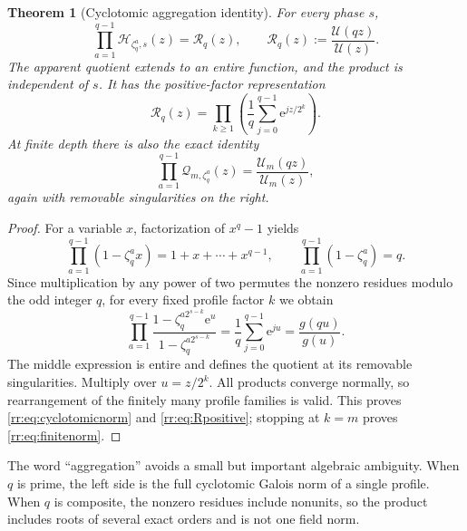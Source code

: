 \documentclass[11pt,a4paper,oneside,openany]{book}
\numberwithin{equation}{chapter}
\newtheorem{theorem}{Theorem}[chapter]
\theoremstyle{definition}
\theoremstyle{remark}
\newcommand{\e}{\mathrm e}
\newcommand{\Up}{\mathcal U}
\newcommand{\Rp}{\mathcal R}
\newcommand{\Hp}{\mathcal H}
\newcommand{\Qp}{\mathcal Q}
\begin{document}
\begin{theorem}[Cyclotomic aggregation identity]
\label{rr:thm:norm}
For every phase \(s\),
\begin{equation}
 \prod_{a=1}^{q-1}\Hp_{\zeta_q^a,s}(z)
 =\Rp_q(z),\qquad
 \Rp_q(z):=\frac{\Up(qz)}{\Up(z)}.
 \label{rr:eq:cyclotomicnorm}
\end{equation}
The apparent quotient extends to an entire function, and the product is independent of \(s\). It has the positive-factor representation
\begin{equation}
 \Rp_q(z)=\prod_{k\geq1}
       \left(\frac1q\sum_{j=0}^{q-1}\e^{jz/2^k}\right).
 \label{rr:eq:Rpositive}
\end{equation}
At finite depth there is also the exact identity
\begin{equation}
 \prod_{a=1}^{q-1}\Qp_{m,\zeta_q^a}(z)
 =\frac{\Up_m(qz)}{\Up_m(z)},
 \label{rr:eq:finitenorm}
\end{equation}
again with removable singularities on the right.
\end{theorem}
\begin{proof}
For a variable \(x\), factorization of \(x^q-1\) yields
\[
 \prod_{a=1}^{q-1}(1-\zeta_q^a x)=1+x+\cdots+x^{q-1},
 \qquad \prod_{a=1}^{q-1}(1-\zeta_q^a)=q.
\]
Since multiplication by any power of two permutes the nonzero residues modulo the odd integer \(q\), for every fixed profile factor \(k\) we obtain
\[
 \prod_{a=1}^{q-1}
 \frac{1-\zeta_q^{a2^{s-k}}\e^u}{1-\zeta_q^{a2^{s-k}}}
 =\frac1q\sum_{j=0}^{q-1}\e^{ju}
 =\frac{g(qu)}{g(u)}.
\]
The middle expression is entire and defines the quotient at its removable singularities. Multiply over \(u=z/2^k\). All products converge normally, so rearrangement of the finitely many profile families is valid. This proves \eqref{rr:eq:cyclotomicnorm} and \eqref{rr:eq:Rpositive}; stopping at \(k=m\) proves \eqref{rr:eq:finitenorm}.
\end{proof}

The word ``aggregation'' avoids a small but important algebraic ambiguity. When \(q\) is prime, the left side is the full cyclotomic Galois norm of a single profile. When \(q\) is composite, the nonzero residues include nonunits, so the product includes roots of several exact orders and is not one field norm.
\end{document}
